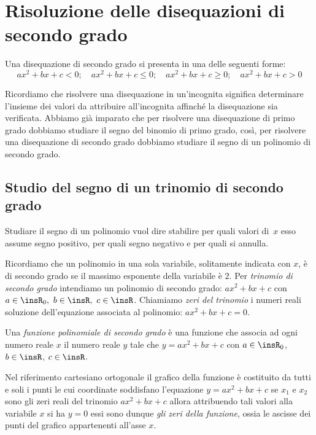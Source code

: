 \section{Risoluzione delle disequazioni di secondo grado}
\label{sec:diseq_secondo_grado}

Una disequazione di secondo grado si presenta in una delle seguenti forme:
\[ax^2+bx+c<0;\quad ax^2+bx+c\le 0;\quad ax^2+bx+c\ge0;\quad ax^2+bx+c> 0\]

Ricordiamo che risolvere una disequazione in un'incognita significa 
determinare 
l'insieme dei valori da attribuire all'incognita affinché la disequazione sia 
verificata.
Abbiamo già imparato che per risolvere una disequazione di primo grado 
dobbiamo 
studiare il segno del binomio di primo grado, così, per risolvere una 
disequazione di secondo grado dobbiamo studiare il segno di un polinomio di 
secondo grado.

\subsection{Studio del segno di un trinomio di secondo grado}
\label{sec:diseq_trinomio}

Studiare il segno di un polinomio vuol dire stabilire per quali valori 
di~\(x\) esso assume segno positivo, per quali segno negativo e per quali 
si annulla.

Ricordiamo che un polinomio in una sola variabile, solitamente indicata con 
\(x\), 
è di secondo grado se il massimo esponente della variabile è \(2\). 
Per \emph{trinomio di secondo grado} intendiamo un polinomio di secondo 
grado: 
\(ax^2+bx+c\) con \(a\in \insR_{0},~b\in \insR,~c\in \insR\). 
Chiamiamo \emph{zeri del trinomio} i numeri reali soluzione dell'equazione 
associata al polinomio: \(ax^2+bx+c=0\).

\begin{definizione}
Una \emph{funzione polinomiale di secondo grado} è una funzione che associa 
ad 
ogni numero reale \(x\) il numero reale \(y\) tale che
\(y=ax^2+bx+c\) con \(a\in \insR_{0}\), \(b\in \insR\), \(c\in \insR\).
\end{definizione}

Nel riferimento cartesiano ortogonale il grafico della funzione è costituito 
da 
tutti e soli i punti le cui coordinate soddisfano l'equazione \(y=ax^2+bx+c\) 
se 
\(x_1\) e \(x_2\) sono gli zeri reali del trinomio \(ax^2+bx+c\) allora attribuendo 
tali valori alla variabile \(x\) si ha \(y=0\) essi sono dunque \emph{gli zeri 
della 
funzione}, ossia le ascisse dei punti del grafico appartenenti all'asse \(x\).

